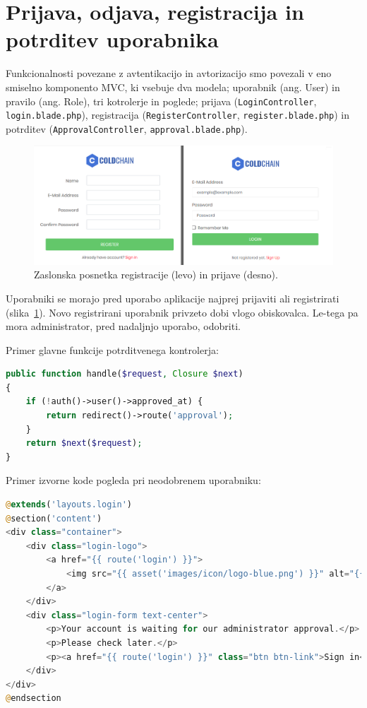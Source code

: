 \documentclass[a4paper, 12pt]{book}
\begin{document}
\section{Prijava, odjava, registracija in potrditev uporabnika}

Funkcionalnosti povezane z avtentikacijo in avtorizacijo smo povezali v eno smiselno komponento MVC, ki vsebuje dva modela; uporabnik (ang. User) in pravilo (ang. Role), tri kotrolerje in poglede; prijava (\verb=LoginController=, \verb=login.blade.php=), registracija (\verb=RegisterController=, \verb=register.blade.php=) in potrditev (\verb=ApprovalController=, \verb=approval.blade.php=).

\begin{figure}[h]
\begin{center}
\includegraphics[width=\textwidth]{slike/registration_login.png}
\end{center}
\caption{Zaslonska posnetka registracije (levo) in prijave (desno).}
\label{ss-registration-login}
\end{figure}

Uporabniki se morajo pred uporabo aplikacije najprej prijaviti ali registrirati (slika~\ref{ss-registration-login}). Novo registrirani uporabnik privzeto dobi vlogo obiskovalca. Le-tega pa mora administrator, pred nadaljnjo uporabo, odobriti.

Primer glavne funkcije potrditvenega kontrolerja:

\begin{lstlisting}[language=PHP, style=mystyle]
public function handle($request, Closure $next)
{
    if (!auth()->user()->approved_at) {
        return redirect()->route('approval');
    }
    return $next($request);
}
\end{lstlisting}

\newpage 

Primer izvorne kode pogleda pri neodobrenem uporabniku:

\begin{lstlisting}[language=PHP, style=mystyle]
@extends('layouts.login')
@section('content')
<div class="container">
    <div class="login-logo">
        <a href="{{ route('login') }}">
            <img src="{{ asset('images/icon/logo-blue.png') }}" alt="{{ config('app.name') }}">
        </a>
    </div>
    <div class="login-form text-center">
        <p>Your account is waiting for our administrator approval.</p>
        <p>Please check later.</p>
        <p><a href="{{ route('login') }}" class="btn btn-link">Sign in</a></p>
    </div>
</div>
@endsection
\end{lstlisting}
\end{document}
